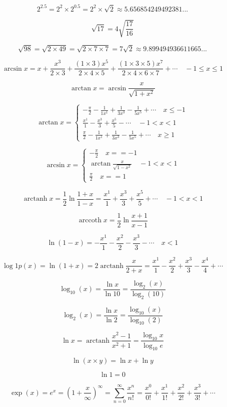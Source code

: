 \documentclass{article}
\DeclareMathOperator{\arctanh}{arctanh}
\DeclareMathOperator{\arccoth}{arccoth}
\begin{document}
\center

$$2^{2.5} = 2^2 \times 2^{0.5} = 2^2 \times \sqrt{2} \approx 5.656854249492381...$$

$$\sqrt{17} = 4\sqrt{\frac{17}{16}}$$

$$\sqrt{98} = \sqrt{2\times49} = \sqrt{2\times7\times7} = 7\sqrt{2}\approx9.899494936611665...$$

$$\arcsin x =
x + \frac{x^3}{2\times3} + \frac{(1\times3)x^5}{2\times4\times5} +
\frac{(1\times3\times5)x^7}{2\times4\times6\times7}+\cdots\quad-1\leq x \leq1$$

$$\arctan x = \arcsin\frac{x}{\sqrt{1+x^2}}$$

$$
\arctan x=\left\{\begin{array}{l}
-\frac{\pi}{2} - \frac{1}{1x^1} + \frac{1}{3x^3} - \frac{1}{5x^5} + \cdots\quad x \leq-1\\
\frac{x^1}{1} - \frac{x^3}{3} + \frac{x^5}{5} - \cdots\quad -1 < x < 1\\
\frac{\pi}{2} - \frac{1}{1x^1} + \frac{1}{3x^3} - \frac{1}{5x^5} + \cdots\quad x \geq 1
\end{array}\right.
$$

$$
\arcsin x =\left\{\begin{array}{l}
-\frac{\pi}{2}\quad x == -1\\
\arctan\frac{x}{\sqrt{1-x^2}}\quad -1 < x < 1\\
\frac{\pi}{2}\quad x == 1
\end{array}\right.
$$

$$\arctanh x = \frac{1}{2}\ln\frac{1 + x}{1 - x} =
\frac{x^1}{1} + \frac{x^3}{3} + \frac{x^5}{5} +\cdots \quad-1 < x < 1$$

$$\arccoth x = \frac{1}{2}\ln\frac{x + 1}{x - 1}$$

$$\ln(1-x) = -\frac{x^1}{1} - \frac{x^2}{2} - \frac{x^3}{3} - \cdots\quad x < 1$$

$$\log1p(x) = \ln(1+x) =
2\arctanh\frac{x}{2+x}=
\frac{x^1}{1} - \frac{x^2}{2} + \frac{x^3}{3} - \frac{x^4}{4} + \cdots$$

$$\log_{10}(x) = \frac{\ln{x}}{\ln{10}} = \frac{\log_2(x)}{\log_2(10)}$$

$$\log_2(x) = \frac{\ln{x}}{\ln{2}} = \frac{\log_{10}(x)}{\log_{10}(2)}$$

$$\ln x = \arctanh\frac{x^2-1}{x^2+1} = \frac{\log_{10}x}{\log_{10}e}$$

$$\ln(x\times y) = \ln x + \ln y$$

$$\ln 1 = 0$$

$$\exp(x) = e^x = (1 + \frac{x}{\infty})^\infty =
\sum_{n=0}^\infty \frac{x^n}{n!} =
\frac{x^0}{0!} + \frac{x^1}{1!} + \frac{x^2}{2!} + \frac{x^3}{3!} + \cdots$$
\end{document}
